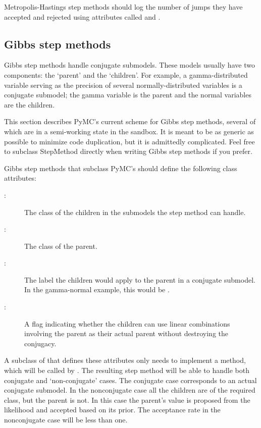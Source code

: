Metropolis-Hastings step methods should log the number of jumps they have accepted and rejected using attributes called  and .


\subsection{Gibbs step methods} \label{user-gibbs}


Gibbs step methods handle conjugate submodels. These models usually have two components: the `parent' and the `children'. For example, a gamma-distributed variable serving as the precision of several normally-distributed variables is a conjugate submodel; the gamma variable is the parent and the normal variables are the children.

This section describes PyMC's current scheme for Gibbs step methods, several of which are in a semi-working state in the sandbox. It is meant to be as generic as possible to minimize code duplication, but it is admittedly complicated. Feel free to subclass StepMethod directly when writing Gibbs step methods if you prefer.

Gibbs step methods that subclass PyMC's  should define the following class attributes:
\begin{description}
   \item[:] The class of the children in the submodels the step method can handle.
   \item[:] The class of the parent.
   \item[:] The label the children would apply to the parent in a conjugate submodel. In the gamma-normal example, this would be .
   \item[:] A flag indicating whether the children can use linear combinations involving the parent as their actual parent without destroying the conjugacy.
\end{description}

A subclass of  that defines these attributes only needs to implement a  method, which will be called by . The resulting step method will be able to handle both conjugate and `non-conjugate' cases. The conjugate case corresponds to an actual conjugate submodel. In the nonconjugate case all the children are of the required class, but the parent is not. In this case the parent's value is proposed from the likelihood and accepted based on its prior. The acceptance rate in the nonconjugate case will be less than one.

